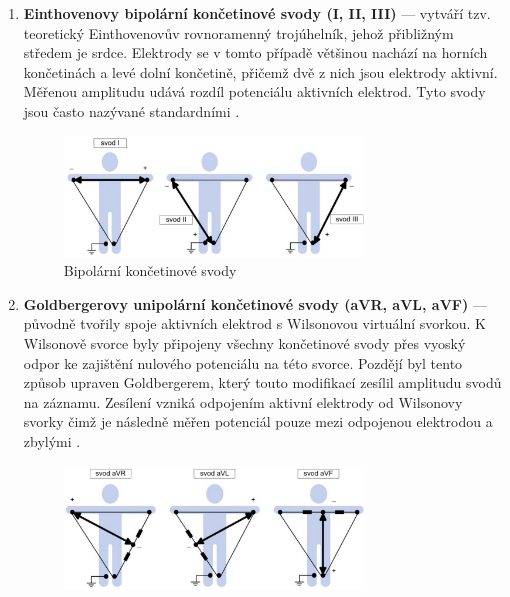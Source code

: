 \begin{enumerate}
	\item \textbf{Einthovenovy bipolární končetinové svody (I, II, III)} ---
	      vytváří tzv. teoretický Einthovenovův rovnoramenný trojúhelník, jehož
	      přibližným středem je srdce. Elektrody se v tomto případě většinou
	      nachází na horních končetinách a levé dolní končetině, přičemž dvě z
	      nich jsou elektrody aktivní. Měřenou amplitudu udává rozdíl potenciálu
	      aktivních elektrod. Tyto svody jsou často nazývané standardními
	      \cite{Kittnar2020}.
	      \begin{figure}[h]
		      \begin{center}
			      \includegraphics[width=0.75\textwidth]{../assets/anatomy/bipolar}
			      \caption{Bipolární končetinové svody \cite{Kittnar2020}}
			      \label{fig:bipolar}
		      \end{center}
	      \end{figure}
	\item \textbf{Goldbergerovy unipolární končetinové svody (aVR, aVL, aVF)}
	      --- původně tvořily spoje aktivních elektrod s Wilsonovou virtuální
	      svorkou. K Wilsonově svorce byly připojeny všechny končetinové svody
	      přes vyoský odpor ke zajištění nulového potenciálu na této svorce.
	      Pozdějí byl tento způsob upraven Goldbergerem, který touto modifikací
	      zesílil amplitudu svodů na záznamu. Zesílení vzniká odpojením aktivní
	      elektrody od Wilsonovy svorky čimž je následně měřen potenciál pouze
	      mezi odpojenou elektrodou a zbylými \cite{Kittnar2020}.
	      \begin{figure}[h]
		      \begin{center}
			      \includegraphics[width=0.75\textwidth]{../assets/anatomy/unipolar1}

\end{center}
\end{figure}
\end{enumerate}
